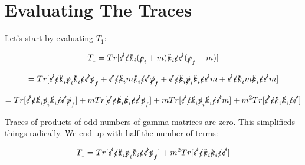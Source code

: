 \documentclass[a4]{article}
\begin{document}
    \section*{Evaluating The Traces}

    Let's start by evaluating $T_1$:

    \begin{equation}
        T_1 = Tr [\slashed{\epsilon'} \slashed{\epsilon} \slashed{k}_i (\slashed{p}_i + m) \slashed{k}_i \slashed{\epsilon} \slashed{\epsilon'} (\slashed{p}_f + m)]
    \end{equation}

    \begin{equation}
        = Tr [\slashed{\epsilon'} \slashed{\epsilon} \slashed{k}_i \slashed{p}_i \slashed{k}_i \slashed{\epsilon} \slashed{\epsilon'} \slashed{p}_f + \slashed{\epsilon'} \slashed{\epsilon} \slashed{k}_i m \slashed{k}_i \slashed{\epsilon} \slashed{\epsilon'} \slashed{p}_f + \slashed{\epsilon'} \slashed{\epsilon} \slashed{k}_i \slashed{p}_i \slashed{k}_i \slashed{\epsilon} \slashed{\epsilon'} m + \slashed{\epsilon'} \slashed{\epsilon} \slashed{k}_i m \slashed{k}_i \slashed{\epsilon} \slashed{\epsilon'} m]
    \end{equation}

    \begin{equation}
        = Tr [\slashed{\epsilon'} \slashed{\epsilon} \slashed{k}_i \slashed{p}_i \slashed{k}_i \slashed{\epsilon} \slashed{\epsilon'} \slashed{p}_f] + m Tr[\slashed{\epsilon'} \slashed{\epsilon} \slashed{k}_i \slashed{k}_i \slashed{\epsilon} \slashed{\epsilon'} \slashed{p}_f] + m Tr[\slashed{\epsilon'} \slashed{\epsilon} \slashed{k}_i \slashed{p}_i \slashed{k}_i \slashed{\epsilon} \slashed{\epsilon'} m] + m^2 Tr[\slashed{\epsilon'} \slashed{\epsilon} \slashed{k}_i \slashed{k}_i \slashed{\epsilon} \slashed{\epsilon'}]
    \end{equation}

    Traces of products of odd numbers of gamma matrices are zero. This simplifieds things radically. We end up with half the number of terms:

    \begin{equation}
        T_1 = Tr [\slashed{\epsilon'} \slashed{\epsilon} \slashed{k}_i \slashed{p}_i \slashed{k}_i \slashed{\epsilon} \slashed{\epsilon'} \slashed{p}_f] + m^2 Tr[\slashed{\epsilon'} \slashed{\epsilon} \slashed{k}_i \slashed{k}_i \slashed{\epsilon} \slashed{\epsilon'}]
    \end{equation}
\end{document}

